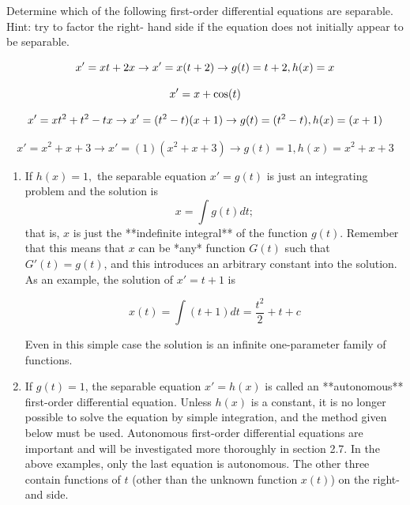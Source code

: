   \begin{problem}
    Determine which of the following first-order differential equations are separable. Hint: try to factor the right- hand side if the equation does not initially appear to be separable.

    \[
      x' = xt + 2x\to x' = x(t + 2)\to g(t) = t + 2,h(x) = x\\
    \]

    \[
      x' = x + \cos (t)\\
    \]
    
    \[
      x' = xt^2 + t^2 - tx\to x' =(t^2 - t)(x + 1)\to g(t) =(t^2 - t),h(x) =(x + 1)\\
    \]

    \[
      x' = x^2 + x + 3\to x' = (1)(x^2 + x + 3)\to g(t) = 1,h(x) = x^2 + x + 3
    \]

    \begin{enumerate}
      \item 
        If $h(x) = 1,$ the separable equation $x'=g(t)$ is just an integrating problem and the solution is 
        \[
          x=\int g(t)dt;
        \]
        that is, $x$ is just the **indefinite integral** of the function $g(t)$. Remember that this means that $x$ can be *any* function $G(t)$ such that $G'(t)=g(t)$, and this introduces an arbitrary constant into the solution. As an example, the solution of $x'=t+1$ is 

        \[
          x(t)=\int(t+1)dt=\frac{t^2}{2}+t+ c
        \]

        Even in this simple case the solution is an infinite one-parameter family of functions.
      
      \item If $g(t)=1$, the separable equation $x'=h(x)$ is called an **autonomous** first-order differential equation. Unless $h(x)$ is a constant, it is no longer possible to solve the equation by simple integration, and the method given below must be used. Autonomous first-order differential equations are important and will be investigated more thoroughly in section 2.7. In the above examples, only the last equation is autonomous. The other three contain functions of $t$ (other than the unknown function $x(t)$) on the right-and side.
    \end{enumerate}
  \end{problem}

